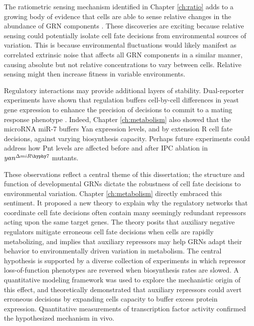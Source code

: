 The ratiometric sensing mechanism identified in Chapter \ref{ch:ratio} adds to a growing body of evidence that cells are able to sense relative changes in the abundance of GRN components \cite{Goentoro2009a,Frick2017}. These discoveries are exciting because relative sensing could potentially isolate cell fate decisions from environmental sources of variation. This is because environmental fluctuations would likely manifest as correlated extrinsic noise that affects all GRN components in a similar manner, causing absolute but not relative concentrations to vary between cells. Relative sensing might then increase fitness in variable environments. 

Regulatory interactions may provide additional layers of stability. Dual-reporter experiments have shown that regulation buffers cell-by-cell differences in yeast gene expression to enhance the precision of decisions to commit to a mating response phenotype \cite{Colman-Lerner2005}. Indeed, Chapter \ref{ch:metabolism} also showed that the microRNA miR-7 buffers Yan expression levels, and by extension R cell fate decisions, against varying biosynthesis capacity. Perhaps future experiments could address how Pnt levels are affected before and after IPC ablation in $yan^{\Delta miR\hyphy 7}$ mutants. 

These observations reflect a central theme of this dissertation; the structure and function of developmental GRNs dictate the robustness of cell fate decisions to environmental variation. Chapter \ref{ch:metabolism} directly embraced this sentiment. It proposed a new theory to explain why the regulatory networks that coordinate cell fate decisions often contain many seemingly redundant repressors acting upon the same target genes. The theory posits that auxiliary negative regulators mitigate erroneous cell fate decisions when cells are rapidly metabolizing, and implies that auxiliary repressors may help GRNs adapt their behavior to environmentally driven variation in metabolism. The central hypothesis is supported by a diverse collection of experiments in which repressor loss-of-function phenotypes are reversed when biosynthesis rates are slowed. A quantitative modeling framework was used to explore the mechanistic origin of this effect, and theoretically demonstrated that auxiliary repressors could avert erroneous decisions by expanding cells capacity to buffer excess protein expression. Quantitative measurements of transcription factor activity confirmed the hypothesized mechanism in vivo.


